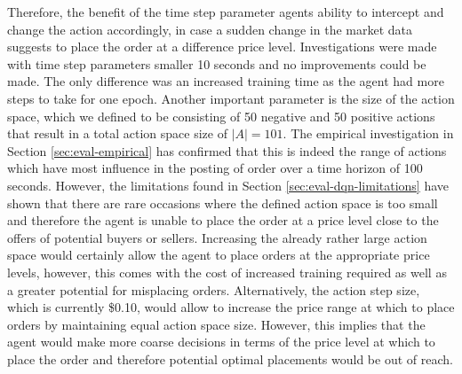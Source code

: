     Therefore, the benefit of the time step parameter agents ability to intercept and change the action accordingly, in case a sudden change in the market data suggests to place the order at a difference price level.
    Investigations were made with time step parameters smaller 10 seconds and no improvements could be made.
    The only difference was an increased training time as the agent had more steps to take for one epoch.
    Another important parameter is the size of the action space, which we defined to be consisting of 50 negative and 50 positive actions that result in a total action space size of $|A|=101$.
    The empirical investigation in Section \ref{sec:eval-empirical} has confirmed that this is indeed the range of actions which have most influence in the posting of order over a time horizon of 100 seconds.
    However, the limitations found in Section \ref{sec:eval-dqn-limitations} have shown that there are rare occasions where the defined action space is too small and therefore the agent is unable to place the order at a price level close to the offers of potential buyers or sellers.
    Increasing the already rather large action space would certainly allow the agent to place orders at the appropriate price levels, however, this comes with the cost of increased training required as well as a greater potential for misplacing orders.
    Alternatively, the action step size, which is currently \$0.10, would allow to increase the price range at which to place orders by maintaining equal action space size.
    However, this implies that the agent would make more coarse decisions in terms of the price level at which to place the order and therefore potential optimal placements would be out of reach.

